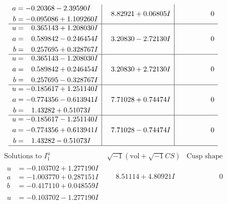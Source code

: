 \documentclass[1p]{elsarticle_modified}
\theoremstyle{definition}
\newcommand{\I}{\sqrt{-1}}
\begin{document}
$$\begin{array}{c|c|c}
\begin{aligned}
a &= -0.20368 - 2.39590 I \\
b &= -0.095086 + 1.109260 I\end{aligned}
 & \phantom{-}8.82921 + 0.06805 I & \phantom{-0.000000 } 0 \\ \hline\begin{aligned}
u &= \phantom{-}0.365143 + 1.208030 I \\
a &= \phantom{-}0.589842 - 0.246454 I \\
b &= \phantom{-}0.257695 + 0.328767 I\end{aligned}
 & \phantom{-}3.20830 - 2.72130 I & \phantom{-0.000000 } 0 \\ \hline\begin{aligned}
u &= \phantom{-}0.365143 - 1.208030 I \\
a &= \phantom{-}0.589842 + 0.246454 I \\
b &= \phantom{-}0.257695 - 0.328767 I\end{aligned}
 & \phantom{-}3.20830 + 2.72130 I & \phantom{-0.000000 } 0 \\ \hline\begin{aligned}
u &= -0.185617 + 1.251140 I \\
a &= -0.774356 - 0.613941 I \\
b &= \phantom{-}1.43282 + 0.51073 I\end{aligned}
 & \phantom{-}7.71028 + 0.74474 I & \phantom{-0.000000 } 0 \\ \hline\begin{aligned}
u &= -0.185617 - 1.251140 I \\
a &= -0.774356 + 0.613941 I \\
b &= \phantom{-}1.43282 - 0.51073 I\end{aligned}
 & \phantom{-}7.71028 - 0.74474 I & \phantom{-0.000000 } 0\\
 \hline 
 \end{array}$$\newpage$$\begin{array}{c|c|c}  
\text{Solutions to }I^u_{1}& \I (\text{vol} + \sqrt{-1}CS) & \text{Cusp shape}\\
 \hline 
\begin{aligned}
u &= -0.103702 + 1.277190 I \\
a &= -1.003770 + 0.287151 I \\
b &= -0.417110 + 0.048559 I\end{aligned}
 & \phantom{-}8.51114 + 4.80921 I & \phantom{-0.000000 } 0 \\ \hline\begin{aligned}
u &= -0.103702 - 1.277190 I \\

\end{aligned}
\end{array}$$
\end{document}
